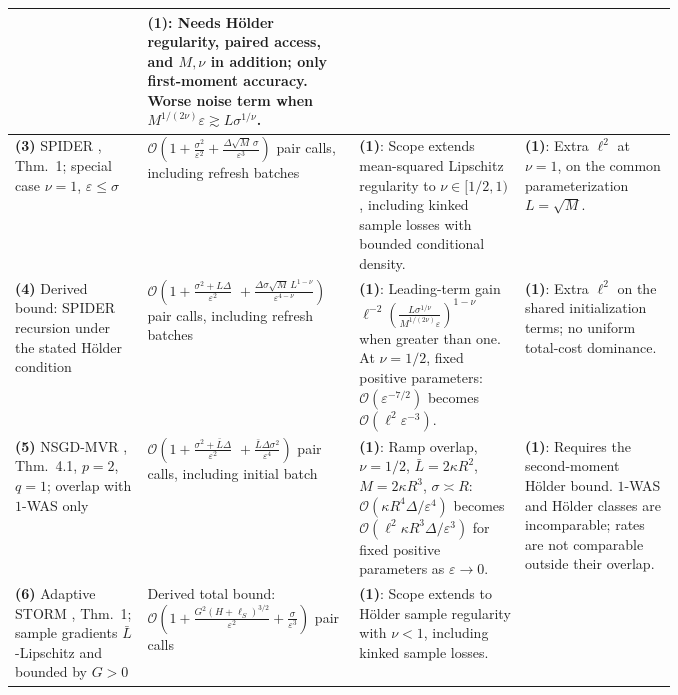 \begin{table}[tp]
\begin{threeparttable}
\begin{tabularx}{\linewidth}{@{}>{\raggedright\arraybackslash}p{0.20\linewidth}>{\raggedright\arraybackslash}p{0.32\linewidth}>{\raggedright\arraybackslash}p{0.25\linewidth}>{\raggedright\arraybackslash}X@{}}
& \textbf{(1)}: Needs H\"older regularity, paired access, and $M,\nu$ in addition; only first-moment accuracy. Worse noise term when $M^{1/(2\nu)}\varepsilon\gtrsim L\sigma^{1/\nu}$. \\
\midrule
\textbf{(3)} SPIDER \citep{ESNFang2018v2}, Thm.~1; special case $\nu=1$, $\varepsilon\le\sigma$
& $\mathcal{O}\!\left(1+\frac{\sigma^2}{\varepsilon^2}+\frac{\Delta\sqrt M\,\sigma}{\varepsilon^3}\right)$ pair calls, including refresh batches
& \textbf{(1)}: Scope extends mean-squared Lipschitz regularity to $\nu\in[1/2,1)$, including kinked sample losses with bounded conditional density.
& \textbf{(1)}: Extra $\ell^2$ at $\nu=1$, on the common parameterization $L=\sqrt M$. \\
\midrule
\textbf{(4)} Derived bound: SPIDER recursion \citep{ESNFang2018v2} under the stated H\"older condition
& $\mathcal{O}\!\left(1+\frac{\sigma^2+L\Delta}{\varepsilon^2}\right.$\newline
$\left.{}+\frac{\Delta\sigma\sqrt M\,L^{1-\nu}}{\varepsilon^{4-\nu}}\right)$ pair calls, including refresh batches
& \textbf{(1)}: Leading-term gain $\ell^{-2}\!\left(\frac{L\sigma^{1/\nu}}{M^{1/(2\nu)}\varepsilon}\right)^{1-\nu}$ when greater than one. At $\nu=1/2$, fixed positive parameters: $\mathcal{O}(\varepsilon^{-7/2})$ becomes $\mathcal{O}(\ell^2\varepsilon^{-3})$.
& \textbf{(1)}: Extra $\ell^2$ on the shared initialization terms; no uniform total-cost dominance. \\
\midrule
\textbf{(5)} NSGD-MVR \citep{mshFradin2026v2}, Thm.~4.1, $p=2$, $q=1$; overlap with $1$-WAS only
& $\mathcal{O}\!\left(1+\frac{\sigma^2+\bar L\Delta}{\varepsilon^2}\right.$\newline
$\left.{}+\frac{\bar L\Delta\sigma^2}{\varepsilon^4}\right)$ pair calls, including initial batch
& \textbf{(1)}: Ramp overlap, $\nu=1/2$, $\bar L=2\kappa R^2$, $M=2\kappa R^3$, $\sigma\asymp R$: $\mathcal{O}(\kappa R^4\Delta/\varepsilon^4)$ becomes $\mathcal{O}(\ell^2\kappa R^3\Delta/\varepsilon^3)$ for fixed positive parameters as $\varepsilon\to0$.
& \textbf{(1)}: Requires the second-moment H\"older bound. $1$-WAS and H\"older classes are incomparable; rates are not comparable outside their overlap. \\
\midrule
\textbf{(6)} Adaptive STORM \citep{mshCutkosky2020v3}, Thm.~1; sample gradients $\bar L$-Lipschitz and bounded by $G>0$
& Derived total bound:\newline
$\mathcal{O}\!\left(1+\frac{G^2(H+\ell_S)^{3/2}}{\varepsilon^2}+\frac{\sigma}{\varepsilon^3}\right)$ pair calls
& \textbf{(1)}: Scope extends to H\"older sample regularity with $\nu<1$, including kinked sample losses.

\end{tabularx}
\end{threeparttable}
\end{table}
